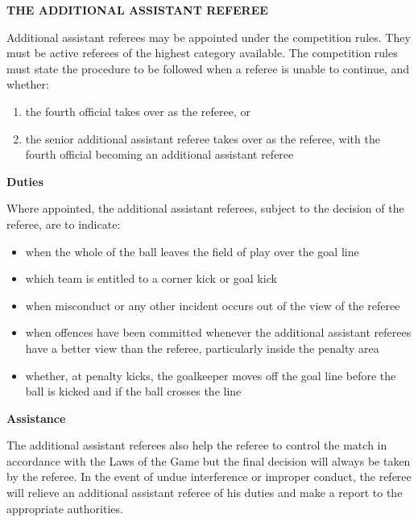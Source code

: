 \clearpage
\sffamily
{\bfseries\color[rgb]{0.4,0.4,0.4}
THE ADDITIONAL ASSISTANT REFEREE}

\bigskip

Additional assistant referees may be appointed under the competition rules. They must be active referees of the highest category available. The competition rules must state the procedure to be followed when a referee is unable to continue, and whether:

\begin{enumerate}
\item the fourth official takes over as the referee, or
\item the senior additional assistant referee takes over as the referee, with the fourth official becoming an additional assistant referee
\end{enumerate}

\bigskip

{\bfseries Duties}

\headlinebox

Where appointed, the additional assistant referees, subject to the decision of the referee, are to indicate:

\begin{itemize}
\item when the whole of the ball leaves the field of play over the goal line
\item which team is entitled to a corner kick or goal kick 
\item when misconduct or any other incident occurs out of the view of the referee
\item when offences have been committed whenever the additional assistant referees have a better view than the referee, particularly inside the penalty area
\item whether, at penalty kicks, the goalkeeper moves off the goal line before the ball is kicked and if the ball crosses the line
\end{itemize}

\bigskip

{\bfseries Assistance}

\headlinebox

The additional assistant referees also help the referee to control the match in accordance with the Laws of the Game but the final decision will always be taken by the referee. In the event of undue interference or improper conduct, the referee will relieve an additional assistant
referee of his duties and make a report to the appropriate authorities.